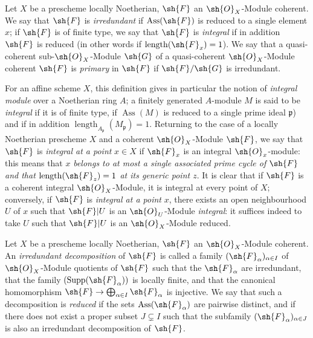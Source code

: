 \begin{definition}[3.2.4]
\label{IV.3.2.4}
Let $X$ be a prescheme locally Noetherian, $\sh{F}$ an $\sh{O}_X$-Module coherent.
We say that $\sh{F}$ is \emph{irredundant} if $\operatorname{Ass}(\sh{F})$ is reduced to a single element $x$; if $\sh{F}$ is of finite type, we say that $\sh{F}$ is \emph{integral} if in addition $\sh{F}$ is reduced (in other words if $\operatorname{length}(\sh{F}_x)=1$).
We say that a quasi-coherent sub-$\sh{O}_X$-Module $\sh{G}$ of a quasi-coherent $\sh{O}_X$-Module coherent $\sh{F}$ is \emph{primary} in $\sh{F}$ if $\sh{F}/\sh{G}$ is irredundant.
\end{definition}

For an affine scheme $X$, this definition gives in particular the notion of \emph{integral module} over a Noetherian ring $A$; a finitely generated $A$-module $M$ is said to be \emph{integral} if it is of finite type, if $\operatorname{Ass}(M)$ is reduced to a single prime ideal $\mathfrak{p}$) and if in addition $\operatorname{length}_{A_\mathfrak{p}}(M_\mathfrak{p})=1$.
Returning to the case of a locally Noetherian prescheme $X$ and a coherent $\sh{O}_X$-Module $\sh{F}$, we say that $\sh{F}$ is \emph{integral at a point} $x\in X$ if $\sh{F}_x$ is an integral $\sh{O}_x$-module: this means that $x$ \emph{belongs to at most a single associated prime cycle of $\sh{F}$ and that $\operatorname{length}(\sh{F}_z)=1$ at its generic point $z$}.
It is clear that if $\sh{F}$ is a coherent integral $\sh{O}_X$-Module, it is integral at every point of $X$; conversely, if $\sh{F}$ is \emph{integral at a point} $x$, there exists an open neighbourhood $U$ of $x$ such that $\sh{F}|U$ is an $\sh{O}_U$-Module \emph{integral}: it suffices indeed to take $U$ such that $\sh{F}|U$ is an $\sh{O}_X$-Module reduced.


\begin{definition}[3.2.5]
\label{IV.3.2.5}
Let $X$ be a prescheme locally Noetherian, $\sh{F}$ an $\sh{O}_X$-Module coherent.
An \emph{irredundant decomposition} of $\sh{F}$ is called a family $(\sh{F}_\alpha)_{\alpha\in I}$ of $\sh{O}_X$-Module quotients of $\sh{F}$ such that the $\sh{F}_\alpha$ are irredundant, that the family $(\operatorname{Supp}(\sh{F}_\alpha))$ is locally finite, and that the canonical homomorphism $\sh{F}\to\bigoplus_{\alpha\in I}\sh{F}_\alpha$ is injective.
We say that such a decomposition is \emph{reduced} if the sets $\operatorname{Ass}(\sh{F}_\alpha)$ are pairwise distinct, and if there does not exist a proper subset $J\subsetneq I$ such that the subfamily $(\sh{F}_\alpha)_{\alpha\in J}$ is also an irredundant decomposition of $\sh{F}$.
\end{definition}

